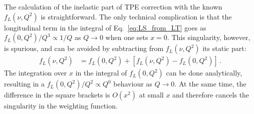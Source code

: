\documentclass[prl,
twocolumn,
showpacs,preprintnumbers,amsmath,amssymb,
superscriptaddress,
a4paper,nofootinbib,longbibliography]{revtex4-2}
\begin{document}
The calculation of the inelastic part of TPE correction with the known $f_L(\nu,Q^2)$ is straightforward. The only technical complication is that the longitudinal term in the integral of Eq.~\ref{eq:LS_from_LT} goes as $f_L(0,Q^2)/Q^3\propto 1/Q$ as $Q\to 0$ when one sets $x=0$. This singularity, however, is spurious, and can be avoided by subtracting from $f_L(\nu,Q^2)$ its static part:
\begin{align}
    f_L(\nu,Q^2) & = f_L(0,Q^2) + \left[f_L(\nu,Q^2)-f_L(0,Q^2)\right]\,.
\end{align}
The integration over $x$ in the integral of $f_L(0,Q^2)$ can be done analytically, resulting in a $f_L(0,Q^2)/Q^2\propto Q^0$ behaviour as $Q\to 0$. At the same time, the difference in the square brackets is $O(x^2)$ at small $x$ and therefore cancels the singularity in the weighting function.
\end{document}
